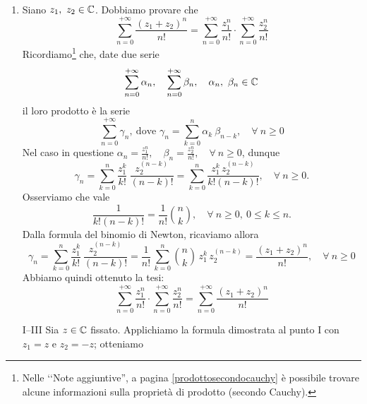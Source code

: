 \begin{demonstration}~{}\\
\begin{enumerate}[label=\Roman*]
\item Siano $z_1,\ z_2\in\mathbb{C}$. Dobbiamo provare che
\begin{equation*}
	\sum_{n=0}^{+\infty} \frac{(z_1+z_2)^n}{n!} =\sum_{n=0}^{+\infty} \frac{z_1^n}{n!} \cdot \sum_{n=0}^{+\infty} \frac{z_2^n}{n!}
\end{equation*}
Ricordiamo\footnote{Nelle ‘‘Note aggiuntive'', a pagina \ref{prodottosecondocauchy} è possibile trovare alcune informazioni sulla proprietà di prodotto (secondo Cauchy).} che, date due serie
\begin{equation*}
	\sum_{n=0}^{+\infty} \alpha_n,\quad \sum_{n=0}^{+\infty} \beta_n,\quad \alpha_n, \ \beta_n \in \mathbb{C}
\end{equation*}
il loro prodotto è la serie
\begin{equation*}
	\sum_{n=0}^{+\infty} \gamma_n,\ \text{dove }\gamma_n= \sum_{k=0}^{n} \alpha_k\ \beta_{n-k},\quad \forall \ n\geq 0
\end{equation*}
Nel caso in questione $\alpha_n=\frac{z_1^n}{n!},\quad \beta_n = \frac{z_2^n}{n!},\quad \forall \ n\geq 0$, dunque
\begin{equation*}
	\gamma_n= \sum_{k=0}^{n} \frac{z_1^k}{k!}\ \frac{z_2^{(n-k)}}{(n-k)!}=\sum_{k=0}^{n} \frac{z_1^k\, z_2^{(n-k)}}{k!(n-k)!},\quad \forall \ n\geq 0.
\end{equation*}
Osserviamo che vale
\begin{equation*}
	\frac{1}{k!(n-k)!}= \frac{1}{n!}\binom{n}{k},\quad \forall \ n\geq 0,\ 0\leq k\leq n.
\end{equation*}
Dalla formula del binomio di Newton, ricaviamo allora
\begin{equation*}
	\gamma_n= \sum_{k=0}^{n} \frac{z_1^k}{k!}\ \frac{z_2^{(n-k)}}{(n-k)!}=\frac{1}{n!}\, \sum_{k=0}^{n} \binom{n}{k}\, z_1^k\, z_2^{(n-k)} =\frac{(z_1+z_2)^n}{n!},\quad \forall \ n\geq 0
\end{equation*}
Abbiamo quindi ottenuto la tesi:
\begin{equation*}
	\sum_{n=0}^{+\infty} \frac{z_1^n}{n!} \cdot \sum_{n=0}^{+\infty} \frac{z_2^n}{n!}= \sum_{n=0}^{+\infty} \frac{(z_1+z_2)^n}{n!}
\end{equation*}
\item[I--III] Sia $z\in\mathbb{C}$ fissato. Applichiamo la formula dimostrata al punto I con $z_1=z$ e $z_2=-z$; otteniamo
\begin{equation*}

\end{equation*}
\end{enumerate}
\end{demonstration}
